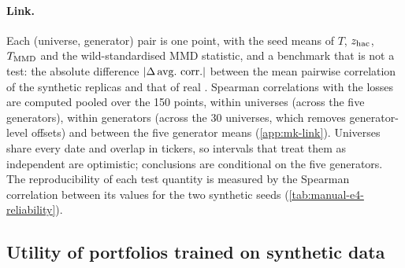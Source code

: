 \paragraph{Link.}
Each (universe, generator) pair is one point, with the seed means of $T$, $z_{\mathrm{hac}}$, $T_{\mathrm{MMD}}$ and the
wild-standardised MMD statistic, and a benchmark that is not a test: the absolute difference
$\lvert\Delta\,\text{avg.\ corr.}\rvert$ between the mean pairwise correlation of the synthetic replicas
and that of real \TRAIN{}. Spearman correlations with the losses are computed pooled over the 150
points, within universes (across the five generators), within generators (across the 30
universes, which removes generator-level offsets) and between the five generator means
(\cref{app:mk-link}). Universes share every \TEST{} date and overlap in tickers, so intervals that
treat them as independent are optimistic; conclusions are conditional on the five generators.
The reproducibility of each test quantity is measured by the Spearman correlation between its
values for the two synthetic seeds (\cref{tab:manual-e4-reliability}).

\subsection{Utility of portfolios trained on synthetic data}\label{sec:mk-utility}

\begin{table}[tbp]
  \centering
  \caption{Utility losses of portfolios trained on synthetic data relative to the same rule
  trained on real \TRAIN{} (E4). Means over 30 universes of 30 assets of the replica-wise losses
  ($B=20$ synthetic \TRAIN{}-length samples per universe and generator), evaluated on the 615
  \TEST{} days. Var.\ ratio: \TEST{} variance of the TSTR portfolio over that of the TRTR
  portfolio; Sharpe loss: annualised Sharpe ratio of TRTR minus TSTR; CE loss: certainty
  equivalent of TRTR minus TSTR, with the $\gamma$ of the rule ($\gamma=5$ for GMV), percent per
  year. Ratios above one and positive losses: TSTR worse. Sample: sample covariance; LW:
  Ledoit--Wolf (identity target), used for both TSTR and TRTR. Point estimates; no intervals.
  Other aggregations: \cref{tab:e4-utility-agg}.}
  \label{tab:e4-utility}
  \small
\end{table}

